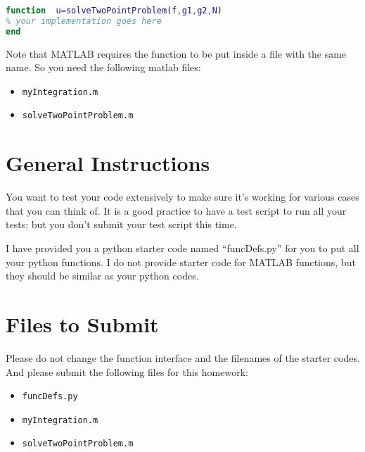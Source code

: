 \documentclass[11pt]{article}
\begin{document}
\begin{enumerate}
\begin{lstlisting}[language=matlab, caption={matlab function for problem 2},label=code:myCode]
function  u=solveTwoPointProblem(f,g1,g2,N)
% your implementation goes here      
end
\end{lstlisting}

Note that MATLAB requires the function to be put inside a file with the same name. So you need the following matlab files:
\begin{itemize}
\item \texttt{myIntegration.m}
  \item \texttt{solveTwoPointProblem.m}
\end{itemize}


%

\end{enumerate}


\section{General Instructions}
You want to test your code extensively to make sure it's working for various cases that you can think of. It is a good practice to have a test script to run all your tests; but you don't submit your test script this time.

I have provided you a python starter code named ``funcDefs.py'' for you to put all your python functions. I do not provide starter code for MATLAB functions, but they should be similar as your python codes.


\section{Files to Submit}
Please do not change the function interface and the filenames of the starter codes. And please submit the following files for this homework:
\begin{itemize}
\item \texttt{funcDefs.py}
\item \texttt{myIntegration.m}
\item \texttt{solveTwoPointProblem.m}
  \end{itemize}
\end{document}
